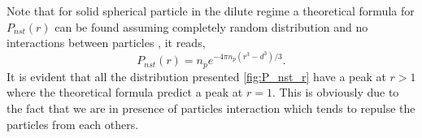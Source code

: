 Note that for solid spherical particle in the dilute regime a theoretical formula for $P_{nst}(r)$ can be found assuming completely random distribution and no interactions between particles \citep{zhang2021ensemble}, it reads, 
\begin{equation*}
    P_{nst}(r) = n_p e^{-4 \pi n_p (r^3 - d^3)/3}.
    \label{eq:P_nst_r}
\end{equation*}
It is evident that all the distribution presented \ref{fig:P_nst_r} have a peak at $r > 1$ where the theoretical formula  predict a peak at $r=1$. 
This is obviously due to the fact that we are in presence of particles interaction which tends to repulse the particles from each others. 